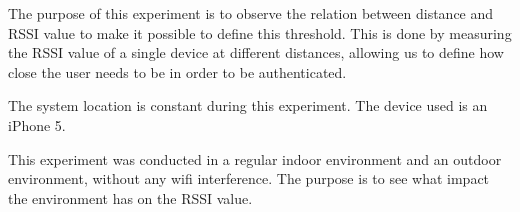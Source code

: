 The purpose of this experiment is to observe the relation between distance and RSSI value to make it possible to  define  this threshold. This is done by measuring the RSSI value of a single device at different distances, allowing us to define how close the user needs to be in order to be authenticated.

The system location is constant during this experiment. The device used is an iPhone 5.

This experiment was conducted in a regular indoor environment and an outdoor environment, without any wifi interference. The purpose is to see what impact the environment has on the RSSI value.


